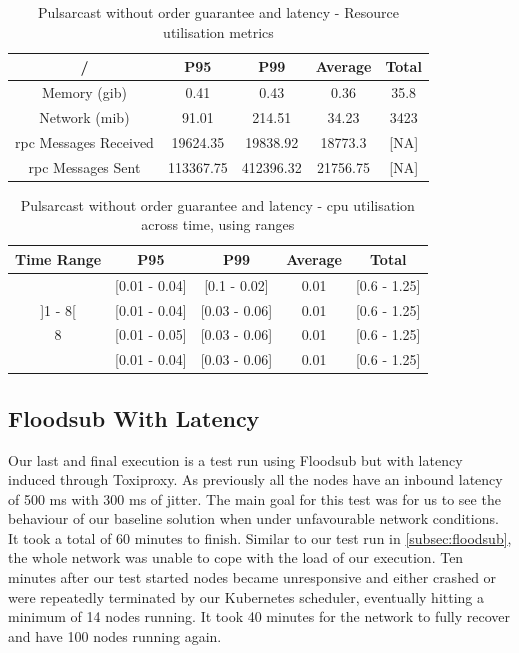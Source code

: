 \begin{table}[!htb]
\caption{Pulsarcast without order guarantee and latency - Resource utilisation metrics}
\label{table:pulsarcast-latency}
  \begin{center}
   \begin{tabular}{|c| c c c c|} 
   \hline
   / & P95 & P99 & Average & Total \\ [0.5ex] 
   \hline\hline
   Memory (\acrshort{gib}) & 0.41 & 0.43 & 0.36 & 35.8 \\
   \hline
   Network (\acrshort{mib}) & 91.01 & 214.51 & 34.23 & 3423 \\
   \hline
   \acrshort{rpc} Messages Received & 19624.35 & 19838.92 & 18773.3 & [NA] \\
   \hline
   \acrshort{rpc} Messages Sent & 113367.75 & 412396.32 & 21756.75 & [NA] \\ [1ex] 
   \hline
  \end{tabular}
  \end{center}
\end{table}

\begin{table}[!htb]
\caption{Pulsarcast without order guarantee and latency - \acrshort{cpu} utilisation across time, using ranges}
\label{table:pulsarcast-latency-cpu}
  \begin{center}
   \begin{tabular}{|c| c c c c|} 
   \hline
   Time Range & P95 & P99 & Average & Total \\ [0.5ex] 
   \hline\hline
   [0 - 1] & [0.01 - 0.04] & [0.1 - 0.02] & 0.01 & [0.6 - 1.25] \\
   \hline
   ]1 - 8[ & [0.01 - 0.04] & [0.03 - 0.06]  & 0.01 & [0.6 - 1.25] \\
   \hline
   8 & [0.01 - 0.05] & [0.03 - 0.06] & 0.01 & [0.6 - 1.25] \\
   \hline
   [8 - 13] & [0.01 - 0.04] & [0.03 - 0.06]  & 0.01 & [0.6 - 1.25] \\
   \hline
  \end{tabular}
  \end{center}
\end{table}

\subsection{Floodsub With Latency}\label{subsec:floodsub-with-latency}

Our last and final execution is a test run using Floodsub but with latency
induced through Toxiproxy. As previously all the nodes have an inbound latency
of 500 ms with 300 ms of jitter. The main goal for this test was for us to see
the behaviour of our baseline solution when under unfavourable network
conditions. It took a total of 60 minutes to finish. Similar to our test run in
\ref{subsec:floodsub}, the whole network was unable to cope with the load of
our execution. Ten minutes after our test started nodes became unresponsive and
either crashed or were repeatedly terminated by our Kubernetes scheduler,
eventually hitting a minimum of 14 nodes running. It took 40 minutes for the
network to fully recover and have 100 nodes running again.

